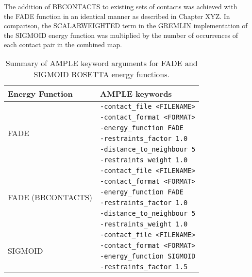 The addition of BBCONTACTS to existing sets of contacts was achieved with the FADE function in an identical manner as described in Chapter XYZ. In comparison, the SCALARWEIGHTED term in the GREMLIN implementation of the SIGMOID energy function \cite{Ovchinnikov2015-nt} was multiplied by the number of occurrences of each contact pair in the combined map.

\begin{table}[H]
    \centering
	\caption{Summary of AMPLE keyword arguments for FADE and SIGMOID ROSETTA energy functions.}
    \label{table:ample_predictors_kwargs}
    \begin{tabularx}{\textwidth}{|X|X|}
        \hline
        \textbf{Energy Function} & \textbf{AMPLE keywords} \\
        \hline \hline
        \multirow{6}{1em}{FADE} & \texttt{-contact\_file <FILENAME>} \\
                                & \texttt{-contact\_format <FORMAT>} \\
                                & \texttt{-energy\_function FADE} \\
                                & \texttt{-restraints\_factor 1.0} \\
                                & \texttt{-distance\_to\_neighbour 5} \\
                                & \texttt{-restraints\_weight 1.0} \\
        \hline
        \multirow{6}{1em}{FADE (BBCONTACTS)} & \texttt{-contact\_file <FILENAME>} \\
                                & \texttt{-contact\_format <FORMAT>} \\
                                & \texttt{-energy\_function FADE} \\
                                & \texttt{-restraints\_factor 1.0} \\
                                & \texttt{-distance\_to\_neighbour 5} \\
                                & \texttt{-restraints\_weight 1.0} \\
        \hline
        \multirow{6}{1em}{SIGMOID} & \texttt{-contact\_file <FILENAME>} \\
                                & \texttt{-contact\_format <FORMAT>} \\
                                & \texttt{-energy\_function SIGMOID} \\
                                & \texttt{-restraints\_factor 1.5} \\

\end{tabularx}
\end{table}
